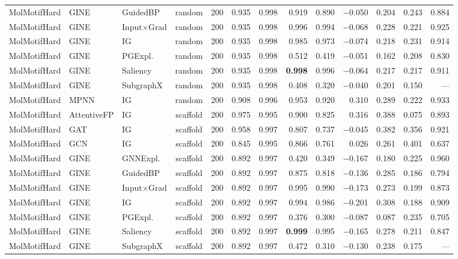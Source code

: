 \begin{table}[t]
{\begin{tabular}{lllcrrrrrrrrr}
MolMotifHard & GINE & GuidedBP & random & 200 & 0.935 & 0.998 & 0.919 & 0.890 & $-$0.050 & 0.204 & 0.243 & 0.884 \\
MolMotifHard & GINE & Input$\times$Grad & random & 200 & 0.935 & 0.998 & 0.996 & 0.994 & $-$0.068 & 0.228 & 0.221 & 0.925 \\
MolMotifHard & GINE & IG & random & 200 & 0.935 & 0.998 & 0.985 & 0.973 & $-$0.074 & 0.218 & 0.231 & 0.914 \\
MolMotifHard & GINE & PGExpl. & random & 200 & 0.935 & 0.998 & 0.512 & 0.419 & $-$0.051 & 0.162 & 0.208 & 0.830 \\
MolMotifHard & GINE & Saliency & random & 200 & 0.935 & 0.998 & \textbf{0.998} & 0.996 & $-$0.064 & 0.217 & 0.217 & 0.911 \\
MolMotifHard & GINE & SubgraphX & random & 200 & 0.935 & 0.998 & 0.408 & 0.320 & $-$0.040 & 0.201 & 0.150 & --- \\
MolMotifHard & MPNN & IG & random & 200 & 0.908 & 0.996 & 0.953 & 0.920 & 0.310 & 0.289 & 0.222 & 0.933 \\
\addlinespace[2pt]
MolMotifHard & AttentiveFP & IG & scaffold & 200 & 0.975 & 0.995 & 0.900 & 0.825 & 0.316 & 0.388 & 0.075 & 0.893 \\
MolMotifHard & GAT & IG & scaffold & 200 & 0.958 & 0.997 & 0.807 & 0.737 & $-$0.045 & 0.382 & 0.356 & 0.921 \\
MolMotifHard & GCN & IG & scaffold & 200 & 0.845 & 0.995 & 0.866 & 0.761 & 0.026 & 0.261 & 0.401 & 0.637 \\
MolMotifHard & GINE & GNNExpl. & scaffold & 200 & 0.892 & 0.997 & 0.420 & 0.349 & $-$0.167 & 0.180 & 0.225 & 0.960 \\
MolMotifHard & GINE & GuidedBP & scaffold & 200 & 0.892 & 0.997 & 0.875 & 0.818 & $-$0.136 & 0.285 & 0.186 & 0.794 \\
MolMotifHard & GINE & Input$\times$Grad & scaffold & 200 & 0.892 & 0.997 & 0.995 & 0.990 & $-$0.173 & 0.273 & 0.199 & 0.873 \\
MolMotifHard & GINE & IG & scaffold & 200 & 0.892 & 0.997 & 0.994 & 0.986 & $-$0.201 & 0.308 & 0.188 & 0.909 \\
MolMotifHard & GINE & PGExpl. & scaffold & 200 & 0.892 & 0.997 & 0.376 & 0.300 & $-$0.087 & 0.087 & 0.235 & 0.705 \\
MolMotifHard & GINE & Saliency & scaffold & 200 & 0.892 & 0.997 & \textbf{0.999} & 0.995 & $-$0.165 & 0.278 & 0.211 & 0.847 \\
MolMotifHard & GINE & SubgraphX & scaffold & 200 & 0.892 & 0.997 & 0.472 & 0.310 & $-$0.130 & 0.238 & 0.175 & --- \\

\end{tabular}}
\end{table}
